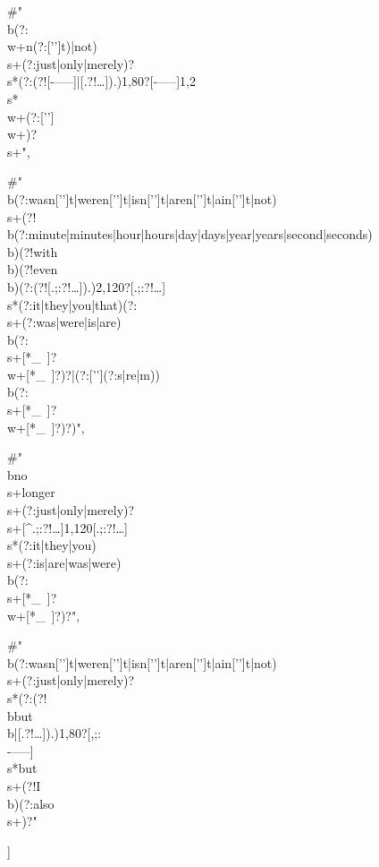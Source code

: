 \documentclass[11pt]{article}
\begin{document}
\begin{cfgblock}
  #"\\b(?:\\w+n(?:['’]t)|not)\\s+(?:just|only|merely)?\\s*(?:(?![-–—]|[.?!…]).){1,80}?[-–—]{1,2}\\s*\\w+(?:['’]\\w+)?\\s+",

  #"\\b(?:wasn['’]t|weren['’]t|isn['’]t|aren['’]t|ain['’]t|not)\\s+(?!\\b(?:minute|minutes|hour|hours|day|days|year|years|second|seconds)\\b)(?!with\\b)(?!even\\b)(?:(?![.;:?!…]).){2,120}?[.;:?!…]\\s*(?:it|they|you|that)(?:\\s+(?:was|were|is|are)\\b(?:\\s+[*_~]?\\w+[*_~]?)?|(?:['’](?:s|re|m))\\b(?:\\s+[*_~]?\\w+[*_~]?)?)",

  #"\\bno\\s+longer\\s+(?:just|only|merely)?\\s+[^.;:?!…]{1,120}[.;:?!…]\\s*(?:it|they|you)\\s+(?:is|are|was|were)\\b(?:\\s+[*_~]?\\w+[*_~]?)?",

  #"\\b(?:wasn['’]t|weren['’]t|isn['’]t|aren['’]t|ain['’]t|not)\\s+(?:just|only|merely)?\\s*(?:(?!\\bbut\\b|[.?!…]).){1,80}?[,;:\\-–—]\\s*but\\s+(?!I\\b)(?:also\\s+)?"

]


\end{cfgblock}
\end{document}
